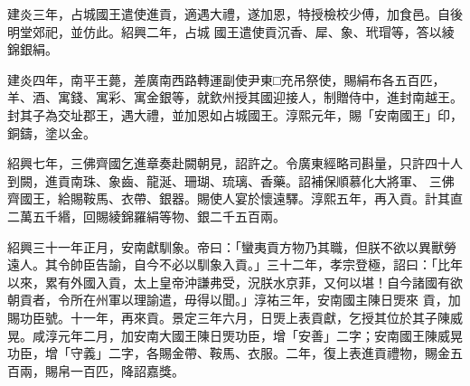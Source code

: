 \begin{pinyinscope}
 建炎三年，占城國王遣使進貢，適遇大禮，遂加恩，特授檢校少傅，加食邑。自後明堂郊祀，並仿此。紹興二年，占城
 國王遣使貢沉香、犀、象、玳瑁等，答以綾錦銀絹。



 建炎四年，南平王薨，差廣南西路轉運副使尹東□充吊祭使，賜絹布各五百匹，羊、酒、寓錢、寓彩、寓金銀等，就欽州授其國迎接人，制贈侍中，進封南越王。封其子為交址郡王，遇大禮，並加恩如占城國王。淳熙元年，賜「安南國王」印，銅鑄，塗以金。



 紹興七年，三佛齊國乞進章奏赴闕朝見，詔許之。令廣東經略司斟量，只許四十人到闕，進貢南珠、象齒、龍涎、珊瑚、琉璃、香藥。詔補保順慕化大將軍、
 三佛齊國王，給賜鞍馬、衣帶、銀器。賜使人宴於懷遠驛。淳熙五年，再入貢。計其直二萬五千緡，回賜綾錦羅絹等物、銀二千五百兩。



 紹興三十一年正月，安南獻馴象。帝曰：「蠻夷貢方物乃其職，但朕不欲以異獸勞遠人。其令帥臣告諭，自今不必以馴象入貢。」三十二年，孝宗登極，詔曰：「比年以來，累有外國入貢，太上皇帝沖謙弗受，況朕水京菲，又何以堪！自今諸國有欲朝貢者，令所在州軍以理諭遣，毋得以聞。」淳祐三年，安南國主陳日煚來
 貢，加賜功臣號。十一年，再來貢。景定三年六月，日煚上表貢獻，乞授其位於其子陳威晃。咸淳元年二月，加安南大國王陳日煚功臣，增「安善」二字；安南國王陳威晃功臣，增「守義」二字，各賜金帶、鞍馬、衣服。二年，復上表進貢禮物，賜金五百兩，賜帛一百匹，降詔嘉獎。



\end{pinyinscope}